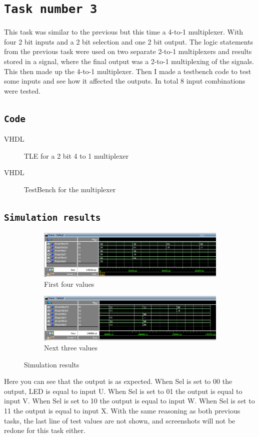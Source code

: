 \documentclass{article}
\let\oldsection\section
\renewcommand{\section}[1]{%
  \oldsection{\texttt{#1}} %
  \setcounter{subsection}{-1} %
  \setcounter{figure}{-1} %
}
\let\oldsubsection\subsection
\renewcommand{\subsection}[1]{%
  \oldsubsection{\texttt{#1}}%
  \setcounter{subsubsection}{-1}%
}
\newcommand{\writecode}[3][Example Code]{%
    \begin{codeBlock}{#1}%
    \end{codeBlock}%
    \begin{figure}[h] %
        \centering
        \renewcommand\figurename{Code}
        \caption{#3} %
        \label{Code:#2} %
    \end{figure}
}
\begin{document}
\section{Task number 3}
This task was similar to the previous but this time a 4-to-1 multiplexer. With four 2 bit inputs and a 2 bit selection and one 2 bit output. The logic statements from the previous task were used on two separate 2-to-1 multiplexers and results stored in a signal, where the final output was a 2-to-1 multiplexing of the signals. This then made up the 4-to-1 multiplexer.  Then I made a testbench code to test some inputs and see how it affected the outputs. In total 8 input combinations were tested.

\subsection{Code}
\writecode[VHDL]{Part3_Code.vhd}{TLE for a 2 bit 4 to 1 multiplexer}
\clearpage
\writecode[VHDL]{Part3_TB.vhd}{TestBench for the multiplexer}
\clearpage

\subsection{Simulation results}
\begin{figure}[h]
    \centering
    \begin{subfigure}{1\textwidth}
        \centering
        \includegraphics[width=1\textwidth]{Figures/Part3_Sim1.png}
        \caption{First four values}
        \label{fig:T03sim1}
    \end{subfigure}
    \begin{subfigure}{1\textwidth}
        \centering
        \includegraphics[width=1\textwidth]{Figures/Part3_Sim2.png}
        \caption{Next three values}
        \label{fig:T03sim2}
    \end{subfigure}
    \caption{Simulation results}
    \label{fig:T03sim}
\end{figure}
Here you can see that the output is as expected. When Sel is set to 00 the output, LED is equal to input U. When Sel is set to 01 the output is equal to input V. When Sel is set to 10 the output is equal to input W. When Sel is set to 11 the output is equal to input X. With the same reasoning as both previous tasks, the last line of test values are not shown, and screenshots will not be redone for this task either.
\end{document}
